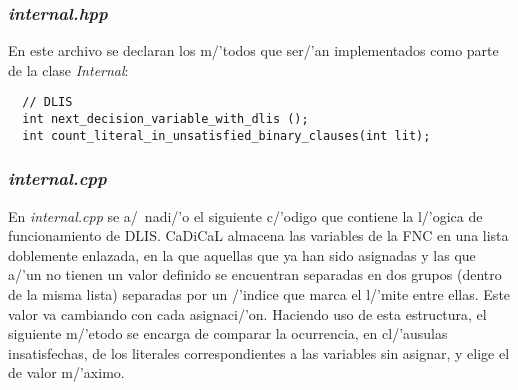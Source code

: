\subsubsection{\textit{internal.hpp}}
En este archivo se declaran los m/'todos que ser/'an implementados como parte de la clase \textit{Internal}:

\begin{lstlisting}
  // DLIS
  int next_decision_variable_with_dlis ();
  int count_literal_in_unsatisfied_binary_clauses(int lit);
\end{lstlisting}

\subsubsection{\textit{internal.cpp}}
En \textit{internal.cpp} se a/~nadi/'o el siguiente c/'odigo que contiene la l/'ogica de funcionamiento de DLIS.
CaDiCaL almacena las variables de la FNC en una lista doblemente enlazada, en la que aquellas que ya han sido asignadas y las que a/'un no tienen un valor definido se encuentran separadas en dos grupos (dentro de la misma lista) separadas por un /'indice que marca el l/'mite entre ellas. Este valor va cambiando con cada asignaci/'on. Haciendo uso de esta estructura, el siguiente m/'etodo se encarga de comparar la ocurrencia, en cl/'ausulas insatisfechas, de los literales correspondientes a las variables sin asignar, y elige el de valor m/'aximo.

